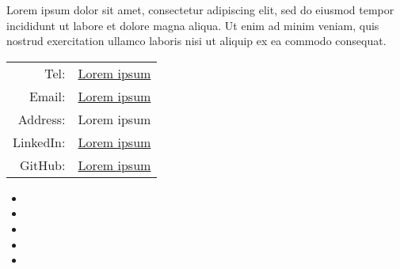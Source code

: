 \documentclass{resume_template}
\begin{document}
	\begin{tcbraster}[grid]
		\begin{tcolorbox}[header,raster multicolumn=2,borderline west={\borderwidth in}{0in}{white}]
		\end{tcolorbox}
		\begin{tcolorbox}[header,raster multicolumn=4,borderline east={\borderwidth in}{0in}{white}]
		\end{tcolorbox}
		\begin{tcolorbox}[sidebar,raster multicolumn=2]
				\vspace*{-0.01in}\noindent
				Lorem ipsum dolor sit amet, consectetur adipiscing elit, sed do eiusmod tempor incididunt ut labore et dolore magna aliqua. Ut enim ad minim veniam, quis nostrud exercitation ullamco laboris nisi ut aliquip ex ea commodo consequat.
			 		
				\vspace*{-0.29in}
				\begin{center}
					\begin{tabular}{r l}
						Tel: & \href{tel:}{Lorem ipsum} \\
						Email: & \href{mailto:}{Lorem ipsum} \\
						Address: & Lorem ipsum \\
						LinkedIn: & \href{http://www.google.com}{Lorem ipsum} \\
						GitHub: & \href{http://www.google.com}{Lorem ipsum} \\			
					\end{tabular}
				\end{center}
			
				\vspace*{-0.325in}
				\begin{itemize}
					\item[] 
					\item[] 
					\item[] 
					\item[] 
					\item[] 
				\end{itemize}
			

\end{tcolorbox}
\end{tcbraster}
\end{document}
